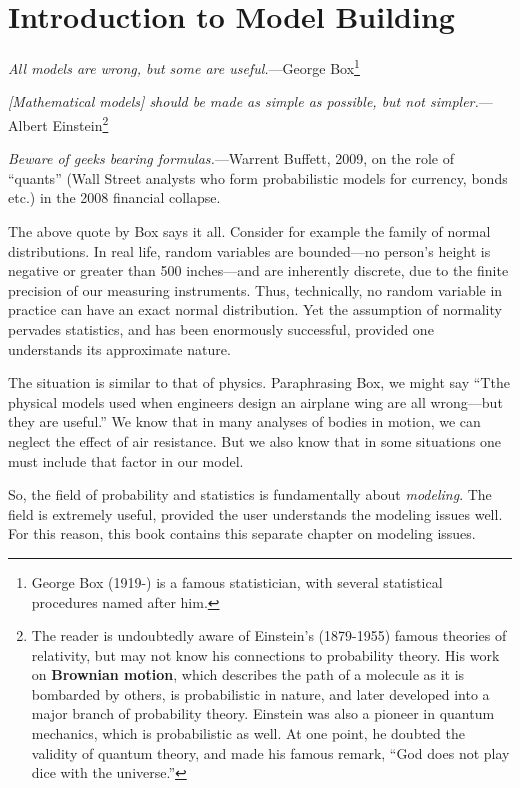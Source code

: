 \chapter{Introduction to Model Building} 
\label{chap:mod}

{\it All models are wrong, but some are useful.}---George
Box\footnote{George Box (1919-) is a famous statistician, with several
statistical procedures named after him.}

{\it [Mathematical models] should be made as simple as possible, but not
simpler.}---Albert Einstein\footnote{The reader is undoubtedly aware of
Einstein's (1879-1955) famous theories of relativity, but may not know
his connections to probability theory.  His work on {\bf Brownian
motion}, which describes the path of a molecule as it is bombarded by
others, is probabilistic in nature, and later developed into a major 
branch of probability theory.  Einstein was also a pioneer in quantum
mechanics, which is probabilistic as well.  At one point, he doubted the
validity of quantum theory, and made his famous remark, ``God does not
play dice with the universe.''}

{\it Beware of geeks bearing formulas.}---Warrent Buffett, 2009, on the
role of ``quants'' (Wall Street analysts who form probabilistic models
for currency, bonds etc.) in the 2008 financial collapse.

\bigskip

The above quote by Box says it all.  Consider for example the family of
normal distributions.  In real life, random variables are bounded---no
person's height is negative or greater than 500 inches---and are
inherently discrete, due to the finite precision of our measuring
instruments.  Thus, technically, no random variable in practice
can have an exact normal distribution.  Yet the assumption of normality
pervades statistics, and has been enormously successful, provided one
understands its approximate nature.  

The situation is similar to that of physics.  Paraphrasing Box, we might
say ``Tthe physical models used when engineers design an airplane wing
are all wrong---but they are useful.''  We know that in many analyses of
bodies in motion, we can neglect the effect of air resistance.  But we
also know that in some situations one must include that factor in our
model.

So, the field of probability and statistics is fundamentally about {\it
modeling}.  The field is extremely useful, provided the user understands
the modeling issues well.  For this reason, this book contains this
separate chapter on modeling issues.

